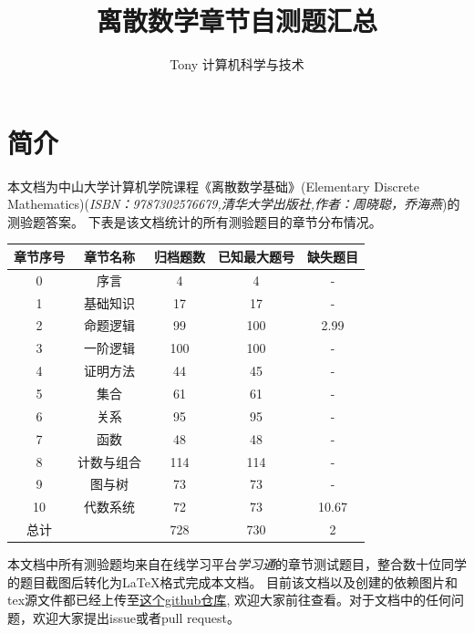 \documentclass[UTF8, heading=true]{ctexart}
\title{\LARGE \textbf{离散数学章节自测题汇总}}
\author{Tony \hspace{2.89cm} 计算机科学与技术}
\begin{document}
\maketitle



{}
\section*{简介}

本文档为中山大学计算机学院课程《离散数学基础》(Elementary Discrete Mathematics)(\textit{ISBN：9787302576679,清华大学出版社,作者：周晓聪，乔海燕})的测验题答案。
下表是该文档统计的所有测验题目的章节分布情况。
\begin{table}[H]
  \renewcommand{\arraystretch}{1.5}
  \centering
\begin{tabular}{|c|c|c|c|c|}
  \hline 章节序号 & 章节名称 & 归档题数 & 已知最大题号 & 缺失题目 \\
  \hline 0 & 序言 & 4 & 4 & - \\
  \hline 1 & 基础知识 & 17 & 17 & - \\
  \hline 2 & 命题逻辑 & 99 & 100 & 2.99 \\
  \hline 3 & 一阶逻辑 & 100 & 100 & - \\
  \hline 4 & 证明方法 & 44 & 45 & - \\
  \hline 5 & 集合 & 61 & 61 & - \\
  \hline 6 & 关系 & 95 & 95 & - \\
  \hline 7 & 函数 & 48 & 48 & - \\
  \hline 8 & 计数与组合 & 114 & 114 & - \\
  \hline 9 & 图与树 & 73 & 73 & - \\
  \hline 10 & 代数系统 & 72 & 73 & 10.67\\
  \hline 总计& & 728 & 730 & 2 \\
  \hline
  \end{tabular}
\end{table}

本文档中所有测验题均来自在线学习平台\textit{学习通}的章节测试题目，整合数十位同学的题目截图后转化为LaTeX格式完成本文档。
目前该文档以及创建的依赖图片和tex源文件都已经上传至\href{https://github.com/BlackMaple1203/SYSU-Discrete-Mathematics-Exam-Answers}{这个github仓库},
欢迎大家前往查看。对于文档中的任何问题，欢迎大家提出issue或者pull request。
\end{document}
